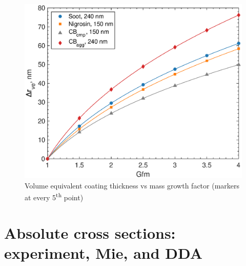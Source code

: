 \documentclass[12pt]{article}
\begin{document}
\begin{figure}[htp]
\centering
\includegraphics[scale=0.7]{images/fig_supp_drve.eps}
\caption{Volume equivalent coating thickness vs mass growth factor (markers at every 5\textsuperscript{th} point)}
\label{s:fig:drve}
\end{figure}

\section{Absolute cross sections: experiment, Mie, and DDA}


\end{document}
